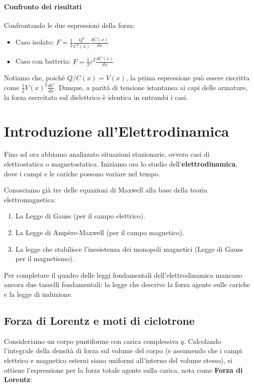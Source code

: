 \documentclass{book}
\begin{document}
\subsubsection*{Confronto dei risultati}
Confrontando le due espressioni della forza:
\begin{itemize}
    \item Caso isolato: $F = \frac{1}{2}\frac{Q^2}{C^2(x)}\frac{dC(x)}{dx}$
    \item Caso con batteria: $F = \frac{1}{2}\varepsilon^2\frac{dC(x)}{dx}$
\end{itemize}
Notiamo che, poiché $Q/C(x) = V(x)$, la prima espressione può essere riscritta come $\frac{1}{2}V(x)^2 \frac{dC}{dx}$.
Dunque, a parità di tensione istantanea ai capi delle armature, la forza esercitata sul dielettrico è identica in entrambi i casi.


\chapter{Introduzione all'Elettrodinamica}

Fino ad ora abbiamo analizzato situazioni stazionarie, ovvero casi di elettrostatica o magnetostatica. Iniziamo ora lo studio dell'\textbf{elettrodinamica}, dove i campi e le cariche possono variare nel tempo.

Conosciamo già tre delle equazioni di Maxwell alla base della teoria elettromagnetica:
\begin{enumerate}
    \item La Legge di Gauss (per il campo elettrico).
    \item La Legge di Ampère-Maxwell (per il campo magnetico).
    \item La legge che stabilisce l'inesistenza dei monopoli magnetici (Legge di Gauss per il magnetismo).
\end{enumerate}
Per completare il quadro delle leggi fondamentali dell'elettrodinamica mancano ancora due tasselli fondamentali: la legge che descrive la forza agente sulle cariche e la legge di induzione.

\section{Forza di Lorentz e moti di ciclotrone}

Consideriamo un corpo puntiforme con carica complessiva $q$. Calcolando l'integrale della densità di forza sul volume del corpo (e assumendo che i campi elettrico e magnetico esterni siano uniformi all'interno del volume stesso), si ottiene l'espressione per la forza totale agente sulla carica, nota come \textbf{Forza di Lorentz}:
\end{document}
